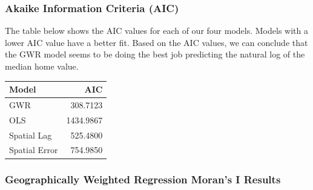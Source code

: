 \documentclass[
]{article}
\newenvironment{Shaded}{\begin{snugshade}}{\end{snugshade}}
\newcommand{\AttributeTok}[1]{\textcolor[rgb]{0.13,0.29,0.53}{#1}}
\newcommand{\FloatTok}[1]{\textcolor[rgb]{0.00,0.00,0.81}{#1}}
\newcommand{\FunctionTok}[1]{\textcolor[rgb]{0.13,0.29,0.53}{\textbf{#1}}}
\newcommand{\NormalTok}[1]{#1}
\newcommand{\OtherTok}[1]{\textcolor[rgb]{0.56,0.35,0.01}{#1}}
\newcommand{\SpecialCharTok}[1]{\textcolor[rgb]{0.81,0.36,0.00}{\textbf{#1}}}
\newcommand{\StringTok}[1]{\textcolor[rgb]{0.31,0.60,0.02}{#1}}
\begin{document}
\hypertarget{akaike-information-criteria-aic}{%
\subsubsection{Akaike Information Criteria
(AIC)}\label{akaike-information-criteria-aic}}

The table below shows the AIC values for each of our four models. Models
with a lower AIC value have a better fit. Based on the AIC values, we
can conclude that the GWR model seems to be doing the best job
predicting the natural log of the median home value.

\begin{Shaded}
\end{Shaded}

\begin{table}
\centering
\begin{tabular}[t]{l|r}
\hline
Model & AIC\\
\hline
GWR & 308.7123\\
\hline
OLS & 1434.9867\\
\hline
Spatial Lag & 525.4800\\
\hline
Spatial Error & 754.9850\\
\hline
\end{tabular}
\end{table}

\hypertarget{geographically-weighted-regression-morans-i-results}{%
\subsubsection{Geographically Weighted Regression Moran's I
Results}\label{geographically-weighted-regression-morans-i-results}}
\end{document}
